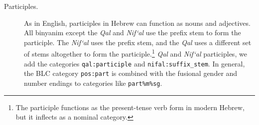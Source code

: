 \begin{description}



\item[Participles.]
As in English, participles in Hebrew can function as nouns and adjectives.
All binyanim except the \textit{Qal} and \textit{Nif`al} use 
the prefix stem to form the participle. The \textit{Nif`al} uses the prefix stem, 
and the \textit{Qal} uses a different set of stems altogether to form the 
participle.\footnote{The participle functions as the present-tense verb form in modern Hebrew, but it inflects as a nominal category.}
\textit{Qal} and \textit{Nif`al} participles, we add the categories \texttt{qal:participle} 
and \texttt{nifal:suffix\_stem}.  In general, the BLC category \texttt{pos:part} 
is combined with the fusional gender and number endings to categories like \texttt{part\%m\%sg}.


\end{description}
